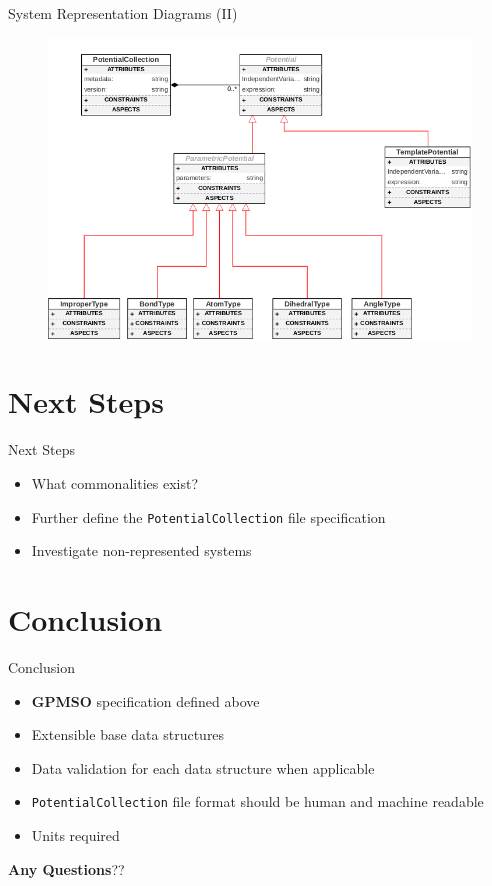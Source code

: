 \documentclass[xcolor=table]{beamer}
\begin{document}
\begin{frame}[plain]{System Representation Diagrams (II)}

\begin{figure}[]
    \centering
    \includegraphics[scale=0.28]{docs/pot}
    \label{fig:TopoDiagram}
\end{figure}
\end{frame}

\section{Next Steps}
\begin{frame}{Next Steps}
    \begin{itemize}
        \item What commonalities exist?
        \item Further define the \texttt{PotentialCollection} file specification
         \item Investigate non-represented systems

    \end{itemize}
\end{frame}

\section{Conclusion}
\begin{frame}{Conclusion}
    \begin{itemize}
        \item \textbf{GPMSO} specification defined above
        \item Extensible base data structures
        \item Data validation for each data structure when applicable
        \item \texttt{PotentialCollection} file format should be human and machine readable
        \item Units required
    \end{itemize}
    \vspace{2em}
    \large \textbf{Any Questions}??
\end{frame}
\end{document}
